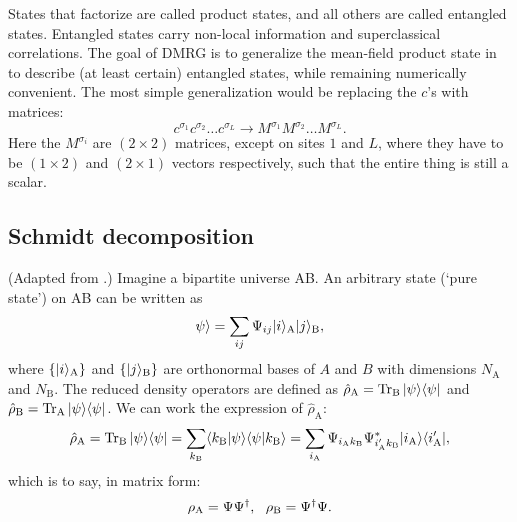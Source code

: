 \documentclass{article}
\begin{document}
States that factorize are called product states, and all others are called entangled states. Entangled states carry non-local information and superclassical correlations. The goal of DMRG is to generalize the mean-field product state in  to describe (at least certain) entangled states, while remaining numerically convenient. The most simple generalization would be replacing the $c$'s with matrices:
\begin{equation}
    c^{\sigma_1}c^{\sigma_2}\dots c^{\sigma_L}\rightarrow M^{\sigma_1}M^{\sigma_2}\dots M^{\sigma_L}.
\end{equation}
Here the $M^{\sigma_i}$ are $(2\times 2)$ matrices, except on sites $1$ and $L$, where they have to be $(1\times 2)$ and $(2\times 1)$ vectors respectively, such that the entire thing is still a scalar.

\subsection{Schmidt decomposition}
(Adapted from \cite{schollwockDensitymatrixRenormalizationGroup2011}.) Imagine a bipartite universe AB. An arbitrary state (`pure state') on AB can be written as
\begin{equation}
    \psi\rangle =\sum_{ij}\Psi_{ij}|i\rangle_{\mathrm{A}}|j\rangle_{\mathrm{B}},
\end{equation}
where $\{|i\rangle_{\mathrm{A}}\}$ and $\{|j\rangle_{\mathrm{B}}\}$ are orthonormal bases of $A$ and $B$ with dimensions $N_{\mathrm{A}}$ and $N_{\mathrm{B}}$. The reduced density operators are defined as $\hat{\rho}_{\mathrm{A}}=\operatorname{Tr}_{\mathrm{B}}|\psi\rangle\langle\psi|$ and $\hat{\rho}_{\mathrm{B}}=\operatorname{Tr}_{\mathrm{A}}|\psi\rangle\langle\psi|$. We can work the expression of $\hat{\rho}_{\mathrm{A}}$:
\begin{equation}
    \hat{\rho}_{\mathrm{A}}=\operatorname{Tr}_{\mathrm{B}}|\psi\rangle\langle\psi|=\sum_{k_{\mathrm{B}}}\langle k_{\mathrm{B}}|\psi\rangle\langle\psi|k_{\mathrm{B}}\rangle=\sum_{i_{\mathrm{A}}}\Psi_{i_{\mathrm{A}}k_{\mathrm{B}}}\Psi^*_{i_{\mathrm{A}}'k_{\mathrm{B}}}|i_{\mathrm{A}}\rangle\langle i'_{\mathrm{A}}|,
\end{equation}
which is to say, in matrix form:
\begin{equation}
    \rho_{\mathrm{A}}=\Psi\Psi\adj,\ \ \rho_{\mathrm{B}}=\Psi\adj\Psi.
\end{equation}
\end{document}
